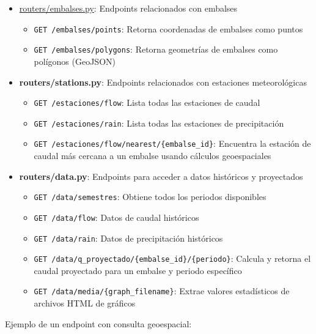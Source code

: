 \begin{itemize}
    \item \url{routers/embalses.py}: Endpoints relacionados con embalses
    \begin{itemize}
        \item \texttt{GET /embalses/points}: Retorna coordenadas de embalses como puntos
        \item \texttt{GET /embalses/polygons}: Retorna geometrías de embalses como polígonos (GeoJSON)
    \end{itemize}
    
    \item \textbf{routers/stations.py}: Endpoints relacionados con estaciones meteorológicas
    \begin{itemize}
        \item \texttt{GET /estaciones/flow}: Lista todas las estaciones de caudal
        \item \texttt{GET /estaciones/rain}: Lista todas las estaciones de precipitación
        \item \texttt{GET /estaciones/flow/nearest/\{embalse\_id\}}: Encuentra la estación de caudal más cercana a un embalse usando cálculos geoespaciales
    \end{itemize}
    
    \item \textbf{routers/data.py}: Endpoints para acceder a datos históricos y proyectados
    \begin{itemize}
        \item \texttt{GET /data/semestres}: Obtiene todos los periodos disponibles
        \item \texttt{GET /data/flow}: Datos de caudal históricos
        \item \texttt{GET /data/rain}: Datos de precipitación históricos
        \item \texttt{GET /data/q\_proyectado/\{embalse\_id\}/\{periodo\}}: Calcula y retorna el caudal proyectado para un embalse y periodo específico
        \item \texttt{GET /data/media/\{graph\_filename\}}: Extrae valores estadísticos de archivos HTML de gráficos
    \end{itemize}
\end{itemize}

Ejemplo de un endpoint con consulta geoespacial:

